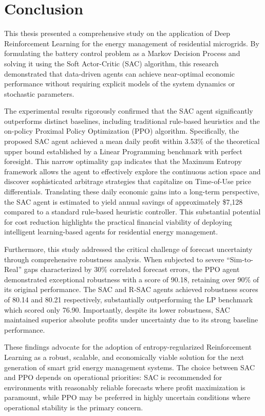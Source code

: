 
\section{Conclusion}

This thesis presented a comprehensive study on the application of Deep Reinforcement Learning for the energy management of residential microgrids. By formulating the battery control problem as a Markov Decision Process and solving it using the Soft Actor-Critic (SAC) algorithm, this research demonstrated that data-driven agents can achieve near-optimal economic performance without requiring explicit models of the system dynamics or stochastic parameters.

The experimental results rigorously confirmed that the SAC agent significantly outperforms distinct baselines, including traditional rule-based heuristics and the on-policy Proximal Policy Optimization (PPO) algorithm. Specifically, the proposed SAC agent achieved a mean daily profit within 3.53\% of the theoretical upper bound established by a Linear Programming benchmark with perfect foresight. This narrow optimality gap indicates that the Maximum Entropy framework allows the agent to effectively explore the continuous action space and discover sophisticated arbitrage strategies that capitalize on Time-of-Use price differentials. Translating these daily economic gains into a long-term perspective, the SAC agent is estimated to yield annual savings of approximately \$7,128 compared to a standard rule-based heuristic controller. This substantial potential for cost reduction highlights the practical financial viability of deploying intelligent learning-based agents for residential energy management.

Furthermore, this study addressed the critical challenge of forecast uncertainty through comprehensive robustness analysis. When subjected to severe ``Sim-to-Real'' gaps characterized by 30\% correlated forecast errors, the PPO agent demonstrated exceptional robustness with a score of 90.18, retaining over 90\% of its original performance. The SAC and R-SAC agents achieved robustness scores of 80.14 and 80.21 respectively, substantially outperforming the LP benchmark which scored only 76.90. Importantly, despite its lower robustness, SAC maintained superior absolute profits under uncertainty due to its strong baseline performance.

These findings advocate for the adoption of entropy-regularized Reinforcement Learning as a robust, scalable, and economically viable solution for the next generation of smart grid energy management systems. The choice between SAC and PPO depends on operational priorities: SAC is recommended for environments with reasonably reliable forecasts where profit maximization is paramount, while PPO may be preferred in highly uncertain conditions where operational stability is the primary concern.

